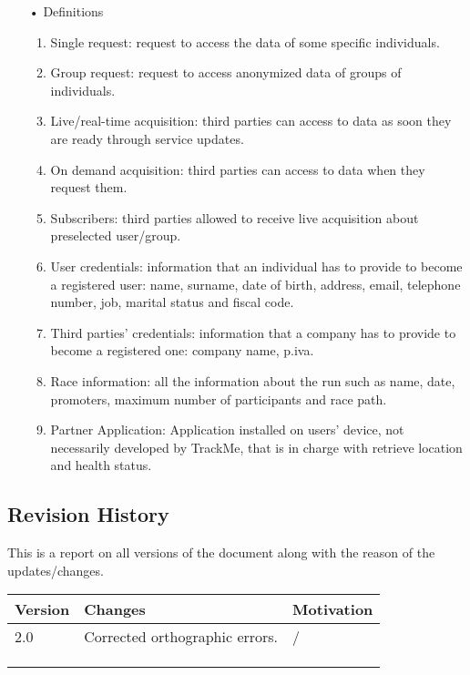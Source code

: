 \begin{enumerate}
\item[•] {\Large Definitions}
	\begin{enumerate}
		\item Single request: request to access the data of some specific  individuals.
		\item Group request: request to access anonymized data of groups of individuals.
		\item Live/real-time acquisition: third parties can access to data as soon they are ready through service updates.
		\item On demand acquisition: third parties can access to data when they request them.
		\item Subscribers: third parties allowed to receive live acquisition about preselected user/group.
		\item User credentials: information that an individual has to provide to become a registered user: name, surname, date of birth, address, email, telephone number, job, marital status and fiscal code. 
		\item Third parties' credentials: information that a company has to provide to become a registered one: company name, p.iva.
		\item Race information: all the information about the run such as name, date, promoters, maximum number of participants and race path.
		\item Partner Application: Application installed on users' device, not necessarily developed by TrackMe, that is in charge with retrieve location and health status. 
	\end{enumerate}
\end{enumerate}
\subsection{Revision History}
This is a report on all versions of the document along with the reason of the updates/changes.

\begin{table}[h]
\begin{tabular}{|l|p{}|p{}|}
\hline
Version & Changes & Motivation\\ \hline
2.0     & Corrected orthographic errors. & / \\ \hline
 & & \\ \hline
 & & \\ \hline
 & & \\ \hline
\end{tabular}
\end{table}

